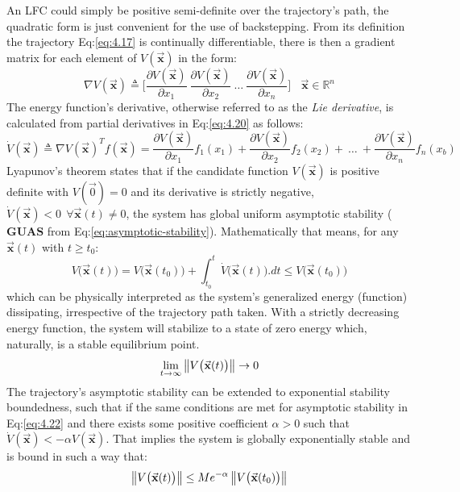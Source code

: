 An LFC could simply be positive semi-definite over the trajectory's path, the quadratic form is just convenient for the use of backstepping. From its definition the trajectory Eq:\ref{eq:4.17} is continually differentiable, there is then a gradient matrix for each element of $V(\vec{\mathbf{x}})$ in the form:
\begin{equation}\label{eq:4.20}
\nabla V(\vec{\mathbf{x}})\triangleq\bigg[\frac{\partial V(\vec{\mathbf{x}})}{\partial x_1}~\frac{\partial V(\vec{\mathbf{x}})}{\partial x_2}~\ldots~\frac{\partial V(\vec{\mathbf{x}})}{\partial x_n}\bigg]~~~~\vec{\mathbf{x}}\in\mathbb{R}^n
\end{equation}
The energy function's derivative, otherwise referred to as the \emph{Lie derivative}, is calculated from partial derivatives in Eq:\ref{eq:4.20} as follows:
\begin{equation}\label{eq:lyapunov-derivative}
\dot{V}(\vec{\mathbf{x}})\triangleq\nabla V(\vec{\mathbf{x}})^Tf(\vec{\mathbf{x}})=\frac{\partial V(\vec{\mathbf{x}})}{\partial x_1}f_1(x_1)+\frac{\partial V(\vec{\mathbf{x}})}{\partial x_2}f_2(x_2)+~\ldots~+\frac{\partial V(\vec{\mathbf{x}})}{\partial x_n}f_n(x_b)
\end{equation}
Lyapunov's theorem states that if the candidate function $V(\vec{\mathbf{x}})$ is positive definite with $V(\vec{0})=0$ and its derivative is strictly negative, $\dot{V}(\vec{\mathbf{x}})< 0~~\forall \vec{\mathbf{x}}(t) \not= 0$, the system has global uniform asymptotic stability ($\mathbf{GUAS}$ from Eq:\ref{eq:asymptotic-stability}). Mathematically that means, for any $\vec{\mathbf{x}}(t)$ with $t\geq t_0$:
\begin{equation}\label{eq:4.22}
V\big(\vec{\mathbf{x}}(t)\big)=V\big(\vec{\mathbf{x}}(t_0)\big)+\int_{t_0}^t \dot{V}\big(\vec{\mathbf{x}}(t)\big).dt \leq V\big(\vec{\mathbf{x}}(t_0)\big)
\end{equation}
which can be physically interpreted as the system's generalized energy (function) dissipating, irrespective of the trajectory path taken. With a strictly decreasing energy function, the system will stabilize to a state of zero energy which, naturally, is a stable equilibrium point.
\begin{equation}
\lim_{t\rightarrow\infty}\left\lVert V\big(\vec{\mathbf{x}}(t)\big)\right\rVert\rightarrow 0
\end{equation}
The trajectory's asymptotic stability can be extended to exponential stability boundedness, such that if the same conditions are met for asymptotic stability in Eq:\ref{eq:4.22} and there exists some positive coefficient $\alpha>0$ such that $\dot{V}(\vec{\mathbf{x}})<-\alpha V(\vec{\mathbf{x}})$. That implies the system is globally exponentially stable and is bound in such a way that:
\begin{equation}\label{eq:lyapunov-exponential-stability}
\left\lVert V\big(\vec{\mathbf{x}}(t)\big)\right\rVert\leq Me^{-\alpha}\left\lVert V\big(\vec{\mathbf{x}}(t_0)\big)\right\rVert
\end{equation}
